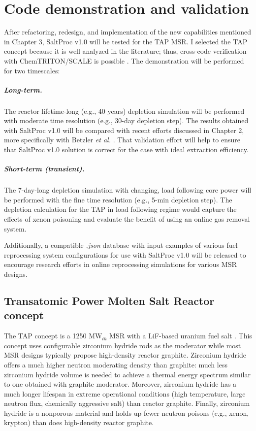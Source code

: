 \chapter[Code demonstration and validation]{Code demonstration and validation}

After refactoring, redesign, and implementation of the new capabilities 
mentioned in Chapter 3, SaltProc v1.0 will be tested for the \gls{TAP} 
\gls{MSR}. I selected the \gls{TAP} concept because it is well analyzed in the 
literature; thus, cross-code verification with ChemTRITON/SCALE is possible 
\cite{betzler_assessment_2017}. The demonstration will be performed for two 
timescales:
\paragraph{Long-term.} The reactor lifetime-long (e.g., 40 years) depletion 
simulation will be performed with moderate time resolution (e.g., 30-day 
depletion step). The results obtained with SaltProc v1.0 will be compared 
with recent efforts discussed in Chapter 2, more specifically with Betzler 
\emph{et al.}  \cite{betzler_assessment_2017}. That validation effort will 
help to ensure that SaltProc v1.0 solution is correct for the case with ideal 
extraction efficiency.
\paragraph{Short-term (transient).} The 7-day-long depletion simulation with 
changing, load following core power will be performed with the fine time 
resolution (e.g., 5-min depletion step). The depletion calculation for the 
\gls{TAP} in load following regime would capture the effects of xenon 
poisoning and evaluate the benefit of using an online gas removal system.

Additionally, a compatible \textit{.json} database with input examples of 
various fuel reprocessing system configurations for use with SaltProc v1.0 
will be released to encourage research efforts in online reprocessing 
simulations for various \gls{MSR} designs.

\section{Transatomic Power Molten Salt Reactor concept}
The \gls{TAP} concept is a 1250 MW$_{th}$ \gls{MSR} with a LiF-based uranium 
fuel salt \cite{transatomic_power_corporation_technical_2016}. This concept 
uses configurable zirconium hydride rods as the moderator while most \gls{MSR} 
designs typically propose high-density reactor graphite. Zirconium hydride 
offers a much higher neutron moderating density than graphite: much less 
zirconium hydride volume is needed to achieve a thermal energy spectrum 
similar to one obtained with graphite moderator. Moreover, zirconium hydride 
has a much longer lifespan in extreme operational conditions (high 
temperature, large neutron flux, chemically aggressive salt) than reactor 
graphite. Finally, zirconium hydride is a nonporous material and holds up 
fewer neutron poisons (e.g., xenon, krypton) than does high-density 
reactor graphite.

